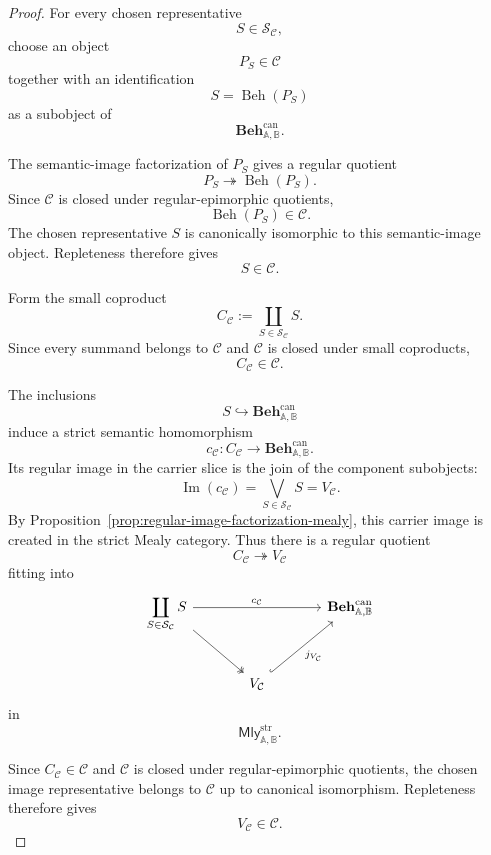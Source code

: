 \begin{proof}
    For every chosen representative
    \[
        S\in\mathcal S_{\mathcal C},
    \]
    choose an object
    \[
        P_S\in\mathcal C
    \]
    together with an identification
    \[
        S=\operatorname{Beh}(P_S)
    \]
    as a subobject of
    \[
        \mathbf{Beh}^{\mathrm{can}}_{\mathbb A,\mathbb B}.
    \]

    The semantic-image factorization of \(P_S\) gives a regular quotient
    \[
        P_S\twoheadrightarrow\operatorname{Beh}(P_S).
    \]
    Since \(\mathcal C\) is closed under regular-epimorphic quotients,
    \[
        \operatorname{Beh}(P_S)\in\mathcal C.
    \]
    The chosen representative \(S\) is canonically isomorphic to this
    semantic-image object. Repleteness therefore gives
    \[
        S\in\mathcal C.
    \]

    Form the small coproduct
    \[
        C_{\mathcal C}
        :=
        \coprod_{S\in\mathcal S_{\mathcal C}}S.
    \]
    Since every summand belongs to \(\mathcal C\) and \(\mathcal C\) is
    closed under small coproducts,
    \[
        C_{\mathcal C}\in\mathcal C.
    \]

    The inclusions
    \[
        S\hookrightarrow
        \mathbf{Beh}^{\mathrm{can}}_{\mathbb A,\mathbb B}
    \]
    induce a strict semantic homomorphism
    \[
        c_{\mathcal C}:
        C_{\mathcal C}
        \longrightarrow
        \mathbf{Beh}^{\mathrm{can}}_{\mathbb A,\mathbb B}.
    \]
    Its regular image in the carrier slice is the join of the component
    subobjects:
    \[
        \operatorname{Im}(c_{\mathcal C})
        =
        \bigvee_{S\in\mathcal S_{\mathcal C}}S
        =
        V_{\mathcal C}.
    \]
    By
    Proposition~\ref{prop:regular-image-factorization-mealy}, this carrier
    image is created in the strict Mealy category. Thus there is a regular
    quotient
    \[
        C_{\mathcal C}
        \twoheadrightarrow
        V_{\mathcal C}
    \]
    fitting into
    \[
    \begin{tikzcd}[column sep=large, row sep=large]
        \displaystyle
        \coprod_{S\in\mathcal S_{\mathcal C}}S
            \arrow[rr, "c_{\mathcal C}"]
            \arrow[dr, two heads]
        &&
        \mathbf{Beh}^{\mathrm{can}}_{\mathbb A,\mathbb B}
        \\
        &
        V_{\mathcal C}
            \arrow[ur, hook, "j_{V_{\mathcal C}}"']
        &
    \end{tikzcd}
    \]
    in
    \[
        \mathsf{Mly}^{\mathrm{str}}_{\mathbb A,\mathbb B}.
    \]

    Since \(C_{\mathcal C}\in\mathcal C\) and \(\mathcal C\) is closed under
    regular-epimorphic quotients, the chosen image representative belongs to
    \(\mathcal C\) up to canonical isomorphism. Repleteness therefore gives
    \[
        V_{\mathcal C}\in\mathcal C.
    \]
\end{proof}

